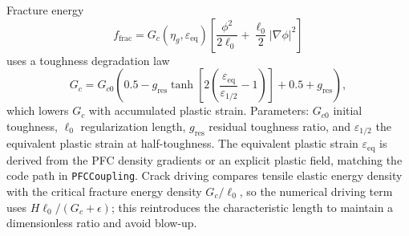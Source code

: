\documentclass[11pt]{article}
\begin{document}
Fracture energy
\begin{equation}
f_{\text{frac}} = G_c(\eta_g, \varepsilon_{\text{eq}}) \left[ \frac{\phi^2}{2\ell_0} + \frac{\ell_0}{2} |\nabla \phi|^2 \right]
\end{equation}
uses a toughness degradation law
\begin{equation}
G_c = G_{c0} \left(0.5 - g_{\text{res}} \tanh \left[ 2 \left(\frac{\varepsilon_{\text{eq}}}{\varepsilon_{1/2}} - 1 \right) \right] + 0.5 + g_{\text{res}} \right),
\end{equation}
which lowers $G_c$ with accumulated plastic strain. Parameters: $G_{c0}$ initial toughness, $\ell_0$ regularization length, $g_{\text{res}}$ residual toughness ratio, and $\varepsilon_{1/2}$ the equivalent plastic strain at half-toughness. The equivalent plastic strain $\varepsilon_{\text{eq}}$ is derived from the PFC density gradients or an explicit plastic field, matching the code path in \texttt{PFCCoupling}.
Crack driving compares tensile elastic energy density with the critical fracture energy density $G_c/\ell_0$, so the numerical driving term uses $H \ell_0 /(G_c + \epsilon)$; this reintroduces the characteristic length to maintain a dimensionless ratio and avoid blow-up.
\end{document}
